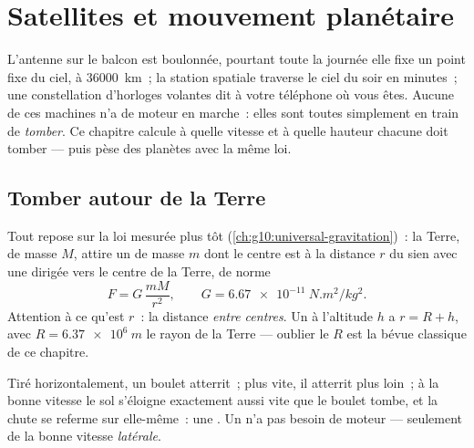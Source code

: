 \chapter{Satellites et mouvement planétaire}\label{ch:g12:satellites-kepler}

L'antenne sur le balcon est boulonnée, pourtant toute la journée elle
fixe un point fixe du ciel, à \qty{36000}{km}~; la station spatiale
traverse le ciel du soir en minutes~; une constellation d'horloges
volantes dit à votre téléphone où vous êtes. Aucune de ces machines
n'a de moteur en marche~: elles sont toutes simplement en train de
\emph{tomber}. Ce chapitre calcule à quelle vitesse et à quelle
hauteur chacune doit tomber --- puis pèse des planètes avec la même
loi.

\section{Tomber autour de la Terre}

Tout repose sur la loi mesurée plus tôt
(\cref{ch:g10:universal-gravitation})~: la Terre, de masse $M$, attire
un  de masse $m$ dont le centre est à la
distance $r$ du sien avec une  dirigée vers le centre
de la Terre, de norme
\[ F = G\,\frac{m M}{r^2}, \qquad G = \qty{6.67e-11}{N.m^2/kg^2}. \]
Attention à ce qu'est $r$~: la distance \emph{entre centres}. Un
 à l'altitude $h$ a $r = R + h$, avec
$R = \qty{6.37e6}{m}$ le rayon de la Terre --- oublier le $R$ est la
bévue classique de ce chapitre.

\begin{remark}\label{rem:g12:satellites-kepler:cannon}
Tiré horizontalement, un boulet atterrit~; plus vite, il atterrit plus
loin~; à la bonne vitesse le sol s'éloigne exactement aussi vite que
le boulet tombe, et la chute se referme sur elle-même~: une
. Un 
n'a pas besoin de moteur --- seulement de la bonne vitesse
\emph{latérale}.
\end{remark}


